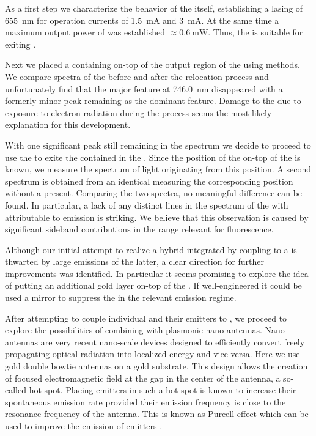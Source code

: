    As a first step we characterize the behavior of the \VCSEL itself, establishing a lasing \wl of \SI{655}{\nm} for operation currents of \SI{1.5}{\mA} and \SI{3}{\mA}. At the same time a maximum output power of was established $\approx \SI{0.6}{\mW}$. Thus, the \VCSEL  is suitable for exiting \sivs.

   Next we placed a \nd containing \sivs on-top of the output region of the \VCSEL using \pp methods. We compare spectra of the \nd before and after the relocation process and unfortunately find that the major \zpl feature at \SI{746.0}{nm} disappeared with a formerly minor peak remaining as the dominant feature. Damage to the \cc due to exposure to electron radiation during the \pp process seems the most likely explanation for this development.

   With one significant peak still remaining in the spectrum we decide to proceed to use the \Vcsel to exite the \sivs contained in the \nd.
   Since the position of the \nd on-top of the \VCSEL is known, we measure the spectrum of light originating from this position. A second spectrum is obtained from an identical \VCSEL measuring the corresponding position without a \nd present. Comparing the two spectra, no meaningful difference can be found. In particular, a lack of any distinct lines in the spectrum of the \VCSEL  with \nd attributable to \siv emission is striking. We believe that this observation is caused by significant \VCSEL sideband contributions in the \wl range relevant for \siv fluorescence.

   Although our initial attempt to realize a hybrid-integrated \sps by coupling \sivs to a \VCSEL is thwarted by large \sb emissions of the latter, a clear direction for further improvements was identified. In particular it seems promising to explore the idea of putting an additional gold layer on-top of the \VCSEL. If well-engineered it could be used a mirror to suppress the \VCSEL \sb in the relevant \siv emission regime.


   After attempting to couple individual \nds and their emitters to \VCSELs, we proceed to explore the possibilities of combining \sivs with plasmonic nano-antennas. Nano-antennas are very recent nano-scale devices designed to efficiently convert freely propagating optical radiation into localized energy and vice versa. Here we use gold double bowtie antennas on a gold substrate. This design allows the creation of focused electromagnetic field at the gap in the center of the antenna, a so-called hot-spot. Placing emitters in such a hot-spot is known to increase their spontaneous emission rate provided their emission frequency is close to the resonance frequency of the antenna. This is known as Purcell effect which can be used to improve the emission of emitters \cite{nancy::86}.

